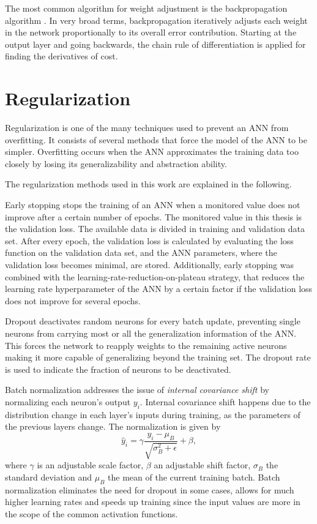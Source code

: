The most common algorithm for weight adjustment is the backpropagation algorithm \cite{Rumelhart:1988:LRB:65669.104451}. In very broad terms, backpropagation iteratively adjusts each weight in the network proportionally to its overall error contribution. Starting at the output layer and going backwards, the chain rule of differentiation is applied for finding the derivatives of cost.

\section{Regularization}
\label{sec:ch_3_regularization}
Regularization is one of the many techniques used to prevent an ANN from overfitting. It consists of several methods that force the model of the ANN to be simpler. Overfitting occurs when the ANN approximates the training data too closely by losing its generalizability and abstraction ability.

The regularization methods used in this work are explained in the following.

Early stopping \cite{Prechelt2012} stops the training of an ANN when a monitored value does not improve after a certain number of epochs. The monitored value in this thesis is the validation loss. The available data is divided in training and validation data set. After every epoch, the validation loss is calculated by evaluating the loss function on the validation data set, and the ANN parameters, where the validation loss becomes minimal, are stored. Additionally, early stopping was combined with the learning-rate-reduction-on-plateau strategy, that reduces the learning rate hyperparameter of the ANN by a certain factor if the validation loss does not improve for several epochs.

Dropout \cite{DBLP:journals/corr/abs-1207-0580} deactivates random neurons for every batch update, preventing single neurons from carrying most or all the generalization information of the ANN. This forces the network to reapply weights to the remaining active neurons making it more capable of generalizing beyond the training set. The dropout rate is used to indicate the fraction of neurons to be deactivated.

Batch normalization \cite{DBLP:journals/corr/IoffeS15} addresses the issue of \emph{internal covariance shift} by normalizing each neuron's output $y_i$. Internal covariance shift happens due to the distribution change in each layer's inputs during training, as the parameters of the previous layers change. The normalization is given by
\begin{equation}
    \hat{y}_i=\gamma \frac{y_i - \mu_B}{\sqrt{\sigma_B^2 + \epsilon}}+\beta,
\end{equation}
where $\gamma$ is an adjustable scale factor, $\beta$ an adjustable shift factor, $\sigma_B$ the standard deviation and $\mu_B$ the mean of the current training batch. Batch normalization eliminates the need for dropout in some cases, allows for much higher learning rates and speeds up training since the input values are more in the scope of the common activation functions.

